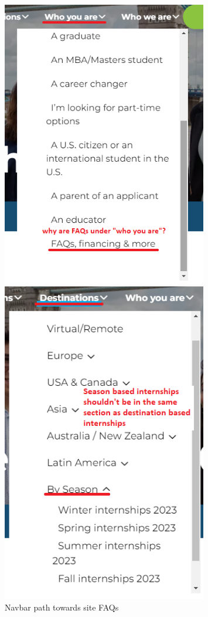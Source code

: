 \documentclass[11pt]{article} %
\begin{document}
\begin{figure}[ht]
  \centering
  \begin{minipage}[b]{0.48\textwidth}
    \includegraphics[width=0.8\textwidth]{Images/faqs.png}
    \caption{Navbar path towards site FAQs}
  \end{minipage}
  \hfill
  \begin{minipage}[b]{0.48\textwidth}
    \includegraphics[width=0.8\textwidth]{Images/destinations.png}

\end{minipage}
\end{figure}
\end{document}
